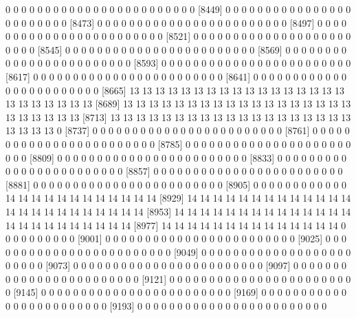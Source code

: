 \documentclass[11pt]{article}
\begin{document}
\begin{Schunk}
\begin{Soutput}
 [8425]  0  0  0  0  0  0  0  0  0  0  0  0  0  0  0  0  0  0  0  0  0  0  0  0
 [8449]  0  0  0  0  0  0  0  0  0  0  0  0  0  0  0  0  0  0  0  0  0  0  0  0
 [8473]  0  0  0  0  0  0  0  0  0  0  0  0  0  0  0  0  0  0  0  0  0  0  0  0
 [8497]  0  0  0  0  0  0  0  0  0  0  0  0  0  0  0  0  0  0  0  0  0  0  0  0
 [8521]  0  0  0  0  0  0  0  0  0  0  0  0  0  0  0  0  0  0  0  0  0  0  0  0
 [8545]  0  0  0  0  0  0  0  0  0  0  0  0  0  0  0  0  0  0  0  0  0  0  0  0
 [8569]  0  0  0  0  0  0  0  0  0  0  0  0  0  0  0  0  0  0  0  0  0  0  0  0
 [8593]  0  0  0  0  0  0  0  0  0  0  0  0  0  0  0  0  0  0  0  0  0  0  0  0
 [8617]  0  0  0  0  0  0  0  0  0  0  0  0  0  0  0  0  0  0  0  0  0  0  0  0
 [8641]  0  0  0  0  0  0  0  0  0  0  0  0  0  0  0  0  0  0  0  0  0  0  0  0
 [8665] 13 13 13 13 13 13 13 13 13 13 13 13 13 13 13 13 13 13 13 13 13 13 13 13
 [8689] 13 13 13 13 13 13 13 13 13 13 13 13 13 13 13 13 13 13 13 13 13 13 13 13
 [8713] 13 13 13 13 13 13 13 13 13 13 13 13 13 13 13 13 13 13 13 13 13 13 13  0
 [8737]  0  0  0  0  0  0  0  0  0  0  0  0  0  0  0  0  0  0  0  0  0  0  0  0
 [8761]  0  0  0  0  0  0  0  0  0  0  0  0  0  0  0  0  0  0  0  0  0  0  0  0
 [8785]  0  0  0  0  0  0  0  0  0  0  0  0  0  0  0  0  0  0  0  0  0  0  0  0
 [8809]  0  0  0  0  0  0  0  0  0  0  0  0  0  0  0  0  0  0  0  0  0  0  0  0
 [8833]  0  0  0  0  0  0  0  0  0  0  0  0  0  0  0  0  0  0  0  0  0  0  0  0
 [8857]  0  0  0  0  0  0  0  0  0  0  0  0  0  0  0  0  0  0  0  0  0  0  0  0
 [8881]  0  0  0  0  0  0  0  0  0  0  0  0  0  0  0  0  0  0  0  0  0  0  0  0
 [8905]  0  0  0  0  0  0  0  0  0  0  0  0 14 14 14 14 14 14 14 14 14 14 14 14
 [8929] 14 14 14 14 14 14 14 14 14 14 14 14 14 14 14 14 14 14 14 14 14 14 14 14
 [8953] 14 14 14 14 14 14 14 14 14 14 14 14 14 14 14 14 14 14 14 14 14 14 14 14
 [8977] 14 14 14 14 14 14 14 14 14 14 14 14 14 14  0  0  0  0  0  0  0  0  0  0
 [9001]  0  0  0  0  0  0  0  0  0  0  0  0  0  0  0  0  0  0  0  0  0  0  0  0
 [9025]  0  0  0  0  0  0  0  0  0  0  0  0  0  0  0  0  0  0  0  0  0  0  0  0
 [9049]  0  0  0  0  0  0  0  0  0  0  0  0  0  0  0  0  0  0  0  0  0  0  0  0
 [9073]  0  0  0  0  0  0  0  0  0  0  0  0  0  0  0  0  0  0  0  0  0  0  0  0
 [9097]  0  0  0  0  0  0  0  0  0  0  0  0  0  0  0  0  0  0  0  0  0  0  0  0
 [9121]  0  0  0  0  0  0  0  0  0  0  0  0  0  0  0  0  0  0  0  0  0  0  0  0
 [9145]  0  0  0  0  0  0  0  0  0  0  0  0  0  0  0  0  0  0  0  0  0  0  0  0
 [9169]  0  0  0  0  0  0  0  0  0  0  0  0  0  0  0  0  0  0  0  0  0  0  0  0
 [9193]  0  0  0  0  0  0  0  0  0  0  0  0  0  0  0  0  0  0  0  0  0  0  0  0

\end{Soutput}
\end{Schunk}
\end{document}
